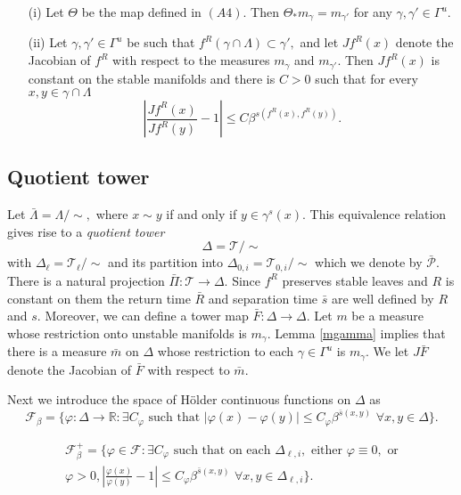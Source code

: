 \documentclass[a4paper,12pt]{amsart}
\numberwithin{equation}{section}
\begin{document}
\begin{lemma}\label{mgamma} \begin{itemize}
\item[(i)] Let $\Theta$ be the map defined in $(A4).$
Then $\Theta_\ast m_\gamma=m_{\gamma'}$ for any
$\gamma,\gamma'\in\Gamma^u.$

\item[(ii)] Let $\gamma, \gamma'\in\Gamma^u$  be such that
$f^R(\gamma\cap\Lambda)\subset\gamma',$ and let $Jf^R(x)$ denote the
Jacobian of $f^R$ with respect to the measures $m_\gamma$ and
$m_{\gamma'}.$ Then $Jf^R(x)$ is constant on the stable manifolds
and there is $C>0$ such that for every $x,y \in\gamma\cap\Lambda$
$$\left|\frac{Jf^R(x)}{Jf^R(y)}-1\right|\le C\beta^{s(f^R(x),
f^R(y))}.$$
\end{itemize}
\end{lemma}

\subsection{Quotient tower} Let $\bar\Lambda=\Lambda/\sim,$ where
$ x \sim y$ if and only if $y\in\gamma^s(x).$ This equivalence
relation gives rise to a \emph{quotient tower}
$$
\Delta=\mathcal T/\sim
$$
 with $\Delta_\ell=\mathcal T_\ell/\sim$ and
its partition into $\Delta_{0, i}=\mathcal T_{0,i}/\sim$ which we
denote by $\bar{\mathcal P}.$ There is a natural projection $\bar
\Pi:\mathcal T\to \Delta.$ Since $f^R$ preserves stable leaves and
$R$ is constant on them the return time $\bar R$ and separation time
$\bar s$ are well defined by $R$ and $s.$ Moreover, we can define a
tower map $\bar F:\Delta\to \Delta.$ Let $m$ be a measure whose
restriction onto unstable manifolds is $m_\gamma.$  Lemma
\ref{mgamma} implies that there is a measure $\bar m$ on $\Delta$
whose restriction to each $\gamma\in \Gamma^u$ is $m_\gamma.$ We let
$J\bar F$ denote the Jacobian of $\bar F$ with respect to $\bar m.$

Next we introduce the space of H\"older continuous functions on
$\Delta$  as
$$
\mathcal F_\beta=\{\varphi:\Delta\to \mathbb{R}: \exists C_\varphi
\,\, \text{such that}\,\, |\varphi(x)-\varphi(y)|\le
C_\varphi\beta^{\bar s(x, y)} \,\, \forall x,y\in\Delta \}.
$$

\begin{align*}
\mathcal F^+_\beta=\big\{\varphi\in\mathcal F: \exists C_\varphi\,\,
\text{such that on each} \,\,\Delta_{\ell, i}, \,\,
\text{either}\,\, \varphi\equiv 0,\,\, \text{or}\\
\varphi>0, \left|\frac{\varphi(x)}{\varphi(y)}-1\right|\le C_\varphi
 \beta^{\bar s(x, y)} \,\,\forall x,y\in \Delta_{\ell,i} \big\}.
\end{align*}
\end{document}
